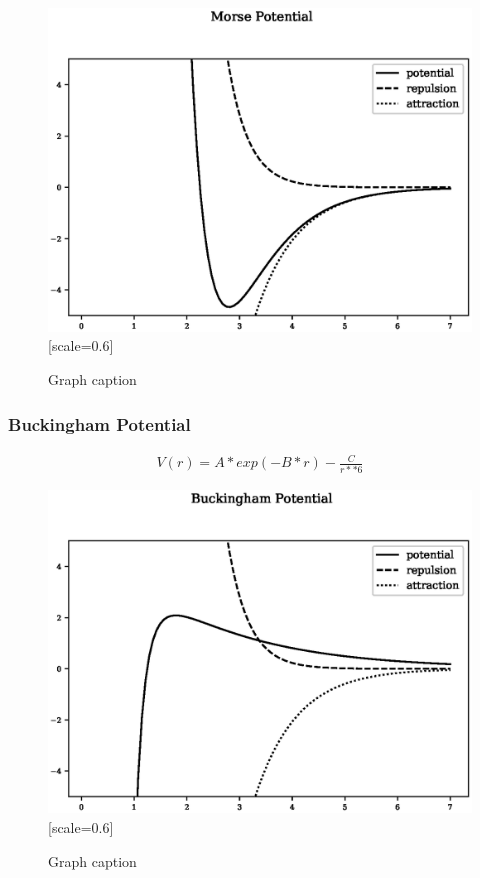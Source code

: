 \begin{figure}[!htbp]
  \begin{center}
    \includegraphics[scale=0.70]{chapters/background_potential_fitting/plots/morse.eps}[scale=0.6]
    \caption{Graph caption}
    \label{graph:graph1}
  \end{center}
\end{figure}



\FloatBarrier
\subsubsection{Buckingham Potential}


\begin{equation}
\begin{split}
V(r) = A * exp(-B * r) - \frac{C}{r**6}
\end{split}
\label{eq:eqLennardJones}
\end{equation}

\begin{figure}[!htbp]
  \begin{center}
    \includegraphics[scale=0.70]{chapters/background_potential_fitting/plots/buckingham.eps}[scale=0.6]
    \caption{Graph caption}
    \label{graph:graph1}
  \end{center}
\end{figure}


